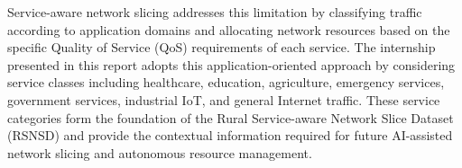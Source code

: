 \documentclass[12pt,a4paper]{report}
\begin{document}
	Service-aware network slicing addresses this limitation by classifying traffic according to application domains and allocating network resources based on the specific Quality of Service (QoS) requirements of each service. The internship presented in this report adopts this application-oriented approach by considering service classes including healthcare, education, agriculture, emergency services, government services, industrial IoT, and general Internet traffic. These service categories form the foundation of the Rural Service-aware Network Slice Dataset (RSNSD) and provide the contextual information required for future AI-assisted network slicing and autonomous resource management.
	
	

\end{document}
